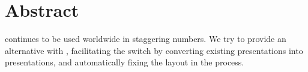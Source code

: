 
 \chapter*{Abstract}

  \ppt continues to be used worldwide in staggering numbers. We try to provide
  an alternative with \mxp, facilitating the switch by converting existing \ppt
  presentations into \mxp presentations, and automatically fixing the layout in
  the process.

